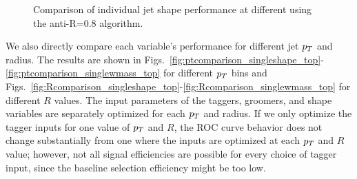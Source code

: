 \begin{figure}
\begin{center}
\caption{Comparison of individual jet shape performance at different \pt using the anti-\kT R=0.8 algorithm.}
\label{fig:topmass_histogram_HEP_JH}
\end{center}
\end{figure}



We also directly compare each variable's performance for different jet $p_T$ and radius. The results are shown in Figs.~\ref{fig:ptcomparison_singleshape_top}-\ref{fig:ptcomparison_singlewmass_top} for different $p_T$ bins and Figs.~\ref{fig:Rcomparison_singleshape_top}-\ref{fig:Rcomparison_singlewmass_top} for different $R$ values. The input parameters of the taggers, groomers, and shape variables are separately optimized for each $p_T$ and radius. If we only optimize the tagger inputs for one value of $p_T$ and $R$, the ROC curve behavior does not change substantially from one where the inputs are optimized at each $p_T$ and $R$ value; however, not all signal efficiencies are possible for every choice of tagger input, since the baseline selection efficiency might be too low. 



